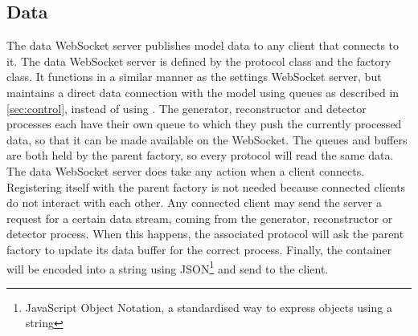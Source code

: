 \documentclass[a4paper, openany, oneside]{memoir}
\begin{document}
\subsection{Data}
\label{sub:websocket_data}
The data WebSocket server publishes model data to any client that connects to it. The data WebSocket server is defined by the  protocol class and the  factory class. It functions in a similar manner as the settings WebSocket server, but maintains a direct data connection with the model using queues as described in \cref{sec:control}, instead of using . The generator, reconstructor and detector processes each have their own queue to which they push the currently processed data, so that it can be made available on the WebSocket. The queues and buffers are both held by the parent factory, so every protocol will read the same data.
The data WebSocket server does take any action when a client connects. Registering itself with the parent factory is not needed because connected clients do not interact with each other.
Any connected client may send the server a request for a certain data stream, coming from the generator, reconstructor or detector process.
When this happens, the associated protocol will ask the parent factory to update its data buffer for the correct process. Finally, the container will be encoded into a string using JSON\footnote{JavaScript Object Notation, a standardised way to express objects using a string} and send to the client.
\end{document}
